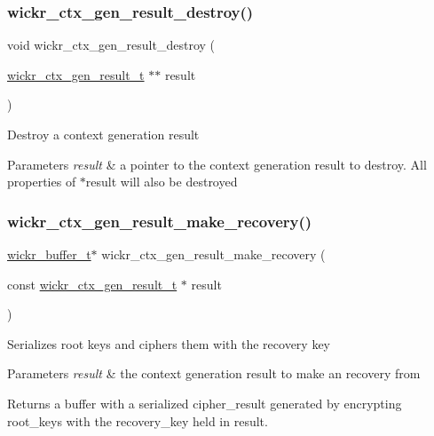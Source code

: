 \subsubsection{\texorpdfstring{wickr\_ctx\_gen\_result\_destroy()}{wickr\_ctx\_gen\_result\_destroy()}}
{\footnotesize\ttfamily void wickr\+\_\+ctx\+\_\+gen\+\_\+result\+\_\+destroy (\begin{DoxyParamCaption}\item[{\mbox{\hyperlink{structwickr__ctx__gen__result}{wickr\+\_\+ctx\+\_\+gen\+\_\+result\+\_\+t}} $\ast$$\ast$}]{result }\end{DoxyParamCaption})}

Destroy a context generation result


\begin{DoxyParams}{Parameters}
{\em result} & a pointer to the context generation result to destroy. All properties of \textquotesingle{}$\ast$result\textquotesingle{} will also be destroyed \\
\hline
\end{DoxyParams}
\mbox{\label{group__wickr__ctx_gaa32727731391f1e3fbde26094924b533}} 
\subsubsection{\texorpdfstring{wickr\_ctx\_gen\_result\_make\_recovery()}{wickr\_ctx\_gen\_result\_make\_recovery()}}
{\footnotesize\ttfamily \mbox{\hyperlink{structwickr__buffer}{wickr\+\_\+buffer\+\_\+t}}$\ast$ wickr\+\_\+ctx\+\_\+gen\+\_\+result\+\_\+make\+\_\+recovery (\begin{DoxyParamCaption}\item[{const \mbox{\hyperlink{structwickr__ctx__gen__result}{wickr\+\_\+ctx\+\_\+gen\+\_\+result\+\_\+t}} $\ast$}]{result }\end{DoxyParamCaption})}

Serializes root keys and ciphers them with the recovery key


\begin{DoxyParams}{Parameters}
{\em result} & the context generation result to make an recovery from \\
\hline
\end{DoxyParams}
\begin{DoxyReturn}{Returns}
a buffer with a serialized cipher\+\_\+result generated by encrypting \textquotesingle{}root\+\_\+keys\textquotesingle{} with the \textquotesingle{}recovery\+\_\+key\textquotesingle{} held in \textquotesingle{}result\textquotesingle{}. 
\end{DoxyReturn}
\mbox{\label{group__wickr__ctx_gaab0b2731d76d6ea91afd1b147c53a29a}} 
